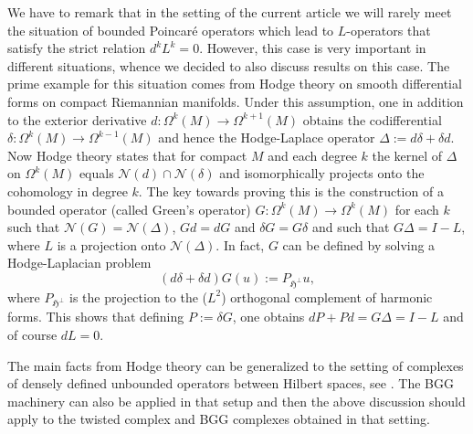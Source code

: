 \documentclass[11pt]{amsart}
\newcommand{\0}{\mathaccent23}
\renewcommand\ker{\mathcal{N}}
\begin{document}
We have to remark that in the setting of the current article we will rarely meet the situation of bounded Poincar\'e operators which lead to $L$-operators that satisfy the strict relation $d^kL^k=0$. However, this case is very important in different situations, whence we decided to also discuss results on this case. The prime example for this situation comes from Hodge theory on smooth differential forms on compact Riemannian manifolds. Under this assumption, one in addition to the exterior derivative $d:\Omega^k(M)\to\Omega^{k+1}(M)$ obtains the codifferential $\delta:\Omega^k(M)\to\Omega^{k-1}(M)$ and hence the Hodge-Laplace operator $\Delta:=d\delta+\delta d$. Now Hodge theory states that for compact $M$ and each degree $k$ the kernel of $\Delta$ on $\Omega^k(M)$ equals $\ker(d)\cap\ker(\delta)$ and isomorphically projects onto the cohomology in degree $k$. The key towards proving this is the construction of a bounded operator (called Green's operator) $G:\Omega^k(M)\to\Omega^k(M)$ for each $k$ such that $\ker(G)=\ker(\Delta)$, $Gd=dG$ and $\delta G=G\delta$ and such that $G\Delta=I-L$, where $L$ is a projection onto $\ker(\Delta)$. In fact, $G$ can be defined by solving a Hodge-Laplacian problem
$$
(d\delta +\delta d)G(u):=P_{\mathfrak{H}^{\perp}} u,
$$
where $P_{\mathfrak{H}^{\perp}}$ is the projection to the ($L^{2}$) orthogonal complement of harmonic forms.
 This shows that defining $P:=\delta G$, one obtains $dP+Pd=G\Delta=I-L$ and of course $dL=0$.

 The main facts from Hodge theory can be generalized to the setting of complexes of densely defined unbounded operators between Hilbert spaces, see \cite{arnold2018finite,Arnold.D;Falk.R;Winther.R.2006a,Arnold.D;Falk.R;Winther.R.2010a}. The BGG machinery can also be applied in that setup and then the above discussion should apply to the twisted complex and BGG complexes obtained in that setting. 


\medskip
\end{document}
